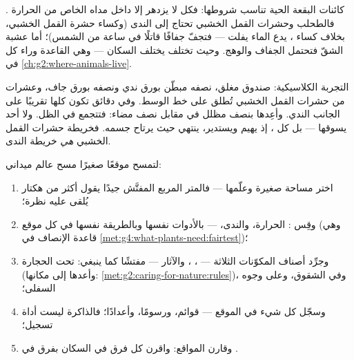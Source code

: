 \begin{proposition}\label{prop:g6:exploring-our-environment:decide}
كائنات البقعة الحية تناسب شروطها: فكل  لا يزدهر إلا داخل مداه
الخاص من الحرارة  . فالطحلب وحشرات القمل الخشبي
تحتاج إلى الندى (وكساء حشرة القمل الخشبي، بخلاف كساء ، يدع
الماء يفلت --- فتجفّ جفافًا قاتلًا في ساعة من الشمس)؛ أما عشبة
الشقّ فتحتمل الجفاف والوهج. وحيث تختلف  يختلف السكان ---
وهي القاعدة وراء كل  في \cref{ch:g2:where-animals-live}.
\end{proposition}
\admitted

\begin{example}\label{ex:g6:exploring-our-environment:chooser}
التجربة الكلاسيكية: صندوق مغلق، نصفه مبطّن بورق ندي ونصفه بورق
جاف، وعشرات من حشرات القمل الخشبي تُطلق على خط الوسط. وفي دقائق
تكون كلها تقريبًا على الجانب الندي. وأعِدها بنصف مظلل في مقابل نصف
مضاء: فتتجمع في الظل. ولا أحد يسوقها --- بل كل ، إذ يهيم
ويستدير، ينتهي حيث يرتاح جسمه. فخريطة حشرات القمل الخشبي
\emph{هي} خريطة الندى.
\end{example}

\begin{method}\label{met:g6:exploring-our-environment:survey}
لتمسح موقعًا صغيرًا مسح عالم ميداني:
\begin{enumerate}
  \item اختر مساحة صغيرة وعلّمها --- فالمتر المربع المفتَّش جيدًا
        يقول أكثر من هكتار يُلقى عليه نظرة؛
  \item وقِس : الحرارة، والندى،  --- بالأدوات نفسها
        وبالطريقة نفسها في كل موقع (وهي قاعدة الإنصاف في
        \cref{met:g4:what-plants-need:fairtest})؛
  \item وجرِّد أصناف المكوّنات الثلاثة --- ،
        ، والآثار --- مفتشًا كما ينبغي: تحت
        الحجارة (وأعدها إلى مكانها:
        \cref{met:g2:caring-for-nature:rules})، وفي الشقوق، وعلى
        وجوه  السفلى؛
  \item وسجّل كل شيء في الموقع --- قوائم، ورسومًا، وأعدادًا؛
        فالذاكرة ليست أداة تسجيل؛
  \item وقارن المواقع: واقرن كل فرق في السكان بفرق في .
\end{enumerate}
\end{method}

